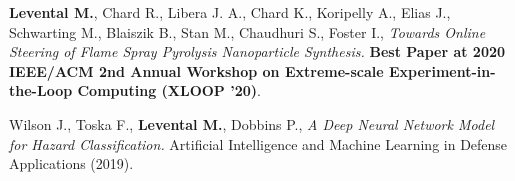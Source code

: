 \documentclass[11pt,letterpaper,roman,colorlinks,linkcolor=blue]{moderncv}
\newcommand*{\modern}{\fontfamily{qhv}\selectfont}
\newcommand{\mystyle}[1]{\textcolor{mygrey}{\modern #1}}
\newcommand{\mysectionstyle}[1]{\large\mystyle{#1}}
\begin{document}
\begin{hangingpar}
\textbf{Levental M.}, Chard R., Libera J. A., Chard K., Koripelly A., Elias J., Schwarting M., Blaiszik B., Stan M., Chaudhuri S., Foster I.,
\textit{Towards Online Steering of Flame Spray Pyrolysis Nanoparticle Synthesis.} 
\textbf{Best Paper at 2020 IEEE/ACM 2nd Annual Workshop on Extreme-scale Experiment-in-the-Loop Computing (XLOOP '20)}.
\end{hangingpar}

\begin{hangingpar}
Wilson J., Toska F., \textbf{Levental M.}, Dobbins P.,
\textit{A Deep Neural Network Model for Hazard Classification.}
Artificial Intelligence and Machine Learning in Defense Applications (2019).
\end{hangingpar}

%
%
%
%
\end{document}
